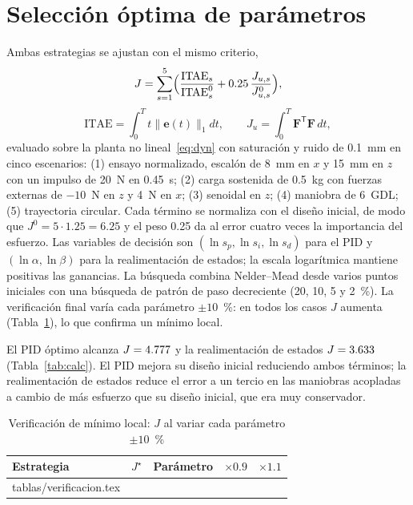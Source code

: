 \documentclass[conference]{IEEEtran}
\makeatletter
\newcommand{\vect}[1]{\bm{#1}}
\newcommand{\T}{^{\mathsf{T}}}
\newcommand{\tabinput}[1]{\@@input #1 }
\makeatother
\begin{document}
\section{Selección óptima de parámetros}\label{sec:opt}

Ambas estrategias se ajustan con el mismo criterio,
\begin{equation}
J = \sum_{s=1}^{5}\Bigl(\frac{\mathrm{ITAE}_s}{\mathrm{ITAE}_s^0} + 0.25\,\frac{J_{u,s}}{J_{u,s}^0}\Bigr),
\label{eq:J}
\end{equation}
\begin{equation}
\mathrm{ITAE} = \int_0^Tt\lVert\vect e(t)\rVert_1dt,\qquad J_u = \int_0^T\vect F\T\vect F\,dt ,
\end{equation}
evaluado sobre la planta no lineal~\eqref{eq:dyn} con saturación y ruido de 0.1~mm en cinco escenarios: (1) ensayo normalizado, escalón de 8~mm en $x$ y 15~mm en $z$ con un impulso de 20~N en 0.45~s; (2) carga sostenida de 0.5~kg con fuerzas externas de $-10$~N en $z$ y 4~N en $x$; (3) senoidal en $z$; (4) maniobra de 6~GDL; (5) trayectoria circular. Cada término se normaliza con el diseño inicial, de modo que $J^0 = 5\cdot1.25 = 6.25$ y el peso 0.25 da al error cuatro veces la importancia del esfuerzo. Las variables de decisión son $(\ln s_p, \ln s_i, \ln s_d)$ para el PID y $(\ln\alpha, \ln\beta)$ para la realimentación de estados; la escala logarítmica mantiene positivas las ganancias. La búsqueda combina Nelder--Mead \cite{nelder1965} desde varios puntos iniciales con una búsqueda de patrón de paso decreciente (20, 10, 5 y 2~\%). La verificación final varía cada parámetro $\pm10$~\%: en todos los casos $J$ aumenta (Tabla~\ref{tab:verif}), lo que confirma un mínimo local.

El PID óptimo alcanza $J = 4.777$ y la realimentación de estados $J = 3.633$ (Tabla~\ref{tab:calc}). El PID mejora su diseño inicial reduciendo ambos términos; la realimentación de estados reduce el error a un tercio en las maniobras acopladas a cambio de más esfuerzo que su diseño inicial, que era muy conservador.

\begin{table}[t]
\centering
\caption{Verificación de mínimo local: $J$ al variar cada parámetro $\pm10$~\%}
\label{tab:verif}
\footnotesize
\begin{tabular}{@{}lrlrr@{}}
\toprule
Estrategia & $J^\star$ & Parámetro & $\times0.9$ & $\times1.1$ \\
\midrule
\tabinput{tablas/verificacion.tex}
\bottomrule
\end{tabular}
\end{table}
\end{document}
